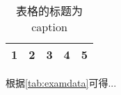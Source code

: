 \documentclass{ctexart}
\begin{document}
\begin{table}[htbp]
    \centering
    \caption{表格的标题为caption}
    \begin{tabular}[b]{*{5}{c}}
    \toprule
    1 & 2 & 3 & 4 & 5 \\
    \bottomrule
    \end{tabular}
    \label{tab:examdata}
\end{table}

\newpage

根据\autoref{tab:examdata}可得...
\end{document}
